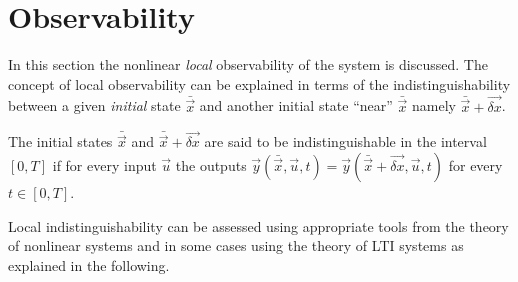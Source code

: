 \section{Observability}
In this section the nonlinear \emph{local} observability of the system is discussed.
The concept of local observability can be explained in terms of the indistinguishability
between a given \emph{initial} state $\bar{\vec{x}}$ and another initial state ``near'' $\bar{\vec{x}}$ namely
$\bar{\vec{x}} + \vec{\delta x}$.
\par
The initial states $\bar{\vec{x}}$ and $\bar{\vec{x}} + \vec{\delta x}$ are said to be
indistinguishable in the interval $[0, T]$ if for every input $\vec{u}$ the outputs
$\vec{y}(\bar{\vec{x}}, \vec{u}, t) = \vec{y}(\bar{\vec{x}} + \vec{\delta x}, \vec{u}, t)$
for every $t \in [0, T]$.
\par
Local indistinguishability can be assessed using appropriate tools from the theory
of nonlinear systems and in some cases using the theory of LTI systems as explained
in the following.


